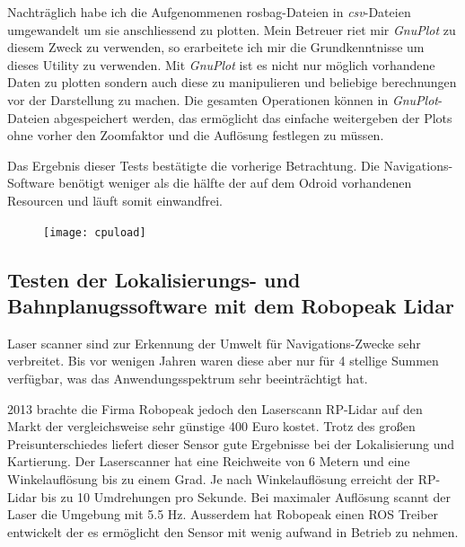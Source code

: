 Nachträglich habe ich die Aufgenommenen \Gls{rosbag}-Dateien in \emph{csv}-Dateien umgewandelt um sie anschliessend zu plotten. Mein Betreuer riet mir \emph{GnuPlot} zu diesem Zweck zu verwenden, so erarbeitete ich mir die Grundkenntnisse um dieses Utility zu verwenden.
Mit \emph{GnuPlot} ist es nicht nur möglich vorhandene Daten zu plotten sondern auch diese zu manipulieren und beliebige berechnungen vor der Darstellung zu machen. 
Die gesamten Operationen können in \emph{GnuPlot}-Dateien abgespeichert werden, das ermöglicht das einfache weitergeben der Plots ohne vorher den Zoomfaktor und die Auflösung festlegen zu müssen.

Das Ergebnis dieser Tests bestätigte die vorherige Betrachtung. Die Navigations-Software benötigt weniger als die hälfte der auf dem Odroid vorhandenen Resourcen und läuft somit einwandfrei.

\begin{figure}[!ht]
\begin{center}
\texttt{[image: cpuload]}
  \label{Lokalisierung und Navigation}
\end{center}
\end{figure}

\FloatBarrier
\subsection{Testen der Lokalisierungs- und Bahnplanugssoftware mit dem Robopeak Lidar}

Laser scanner sind zur Erkennung der Umwelt für Navigations-Zwecke sehr verbreitet. Bis vor wenigen Jahren waren diese aber nur für 4 stellige Summen verfügbar, was das Anwendungsspektrum sehr beeinträchtigt hat.

2013 brachte die Firma Robopeak jedoch den Laserscann RP-Lidar auf den Markt der vergleichsweise sehr günstige 400 Euro kostet. Trotz des großen Preisunterschiedes liefert dieser Sensor gute Ergebnisse bei der Lokalisierung und Kartierung.
Der Laserscanner hat eine Reichweite von 6 Metern und eine Winkelauflösung bis zu einem Grad. Je nach Winkelauflösung erreicht der RP-Lidar bis zu 10 Umdrehungen pro Sekunde. Bei maximaler Auflösung scannt der Laser die Umgebung mit 5.5 Hz.
Ausserdem hat Robopeak einen ROS Treiber entwickelt der es ermöglicht den Sensor mit wenig aufwand in Betrieb zu nehmen.

